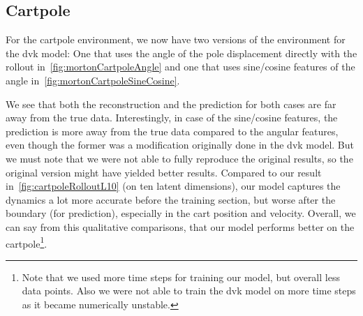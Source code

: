 	\subsection{Cartpole}
		For the cartpole environment, we now have two versions of the environment for the \ac{dvk} model: One that uses the angle of the pole displacement directly with the rollout in~\autoref{fig:mortonCartpoleAngle} and one that uses sine/cosine features of the angle in~\autoref{fig:mortonCartpoleSineCosine}.

		We see that both the reconstruction and the prediction for both cases are far away from the true data. Interestingly, in case of the sine/cosine features, the prediction is more away from the true data compared to the angular features, even though the former was a modification originally done in the \ac{dvk} model. But we must note that we were not able to fully reproduce the original results, so the original version might have yielded better results. Compared to our result in~\autoref{fig:cartpoleRolloutL10} (on ten latent dimensions), our model captures the dynamics a lot more accurate before the training section, but worse after the boundary (\ie for prediction), especially in the cart position and velocity. Overall, we can say from this qualitative comparisons, that our model performs better on the cartpole\footnote{Note that we used more time steps for training our model, but overall less data points. Also we were not able to train the \ac{dvk} model on more time steps as it became numerically unstable.}.

